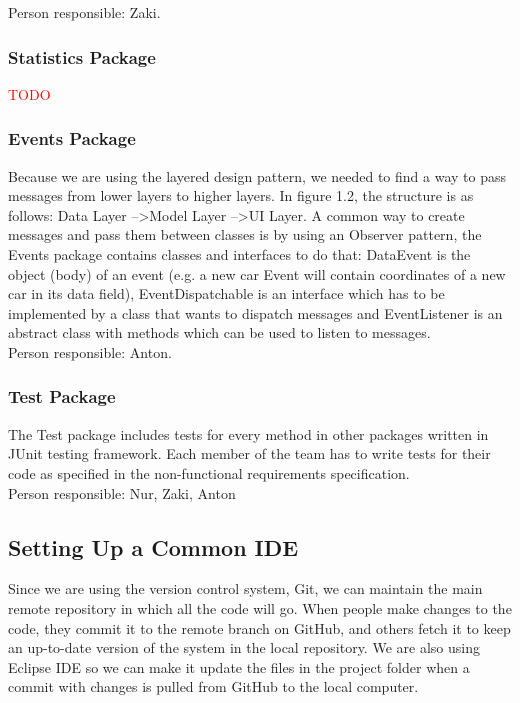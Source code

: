 \documentclass{article}
\begin{document}
	\noindent
	Person responsible: Zaki.
	
	\subsubsection{Statistics Package}
	\textcolor{red}{TODO}
	
	\subsubsection{Events Package}
	Because we are using the layered design pattern, we needed to find a way to pass messages from lower layers to higher layers. In figure 1.2, the structure is as follows: Data Layer --\textgreater Model Layer --\textgreater UI Layer. 
	A common way to create messages and pass them between classes is by using an Observer pattern, the Events package contains classes and interfaces to do that: DataEvent is the object (body) of an event (e.g. a new car Event will contain coordinates of a new car in its data field), EventDispatchable is an interface which has to be implemented by a class that wants to dispatch messages and EventListener is an abstract class with methods which can be used to listen to messages.\\
	
	\noindent
	Person responsible: Anton.
	
	\subsubsection{Test Package}
	The Test package includes tests for every method in other packages written in JUnit testing framework. 
	Each member of the team has to write  tests for their code as specified in the non-functional requirements specification.\\
	
	\noindent
	Person responsible: Nur, Zaki, Anton
	
	\subsection{Setting Up a Common IDE}
	
	Since we are using the version control system, Git, we can maintain the main remote repository in which all the code will go. 
	When people make changes to the code, they commit it to the remote branch on GitHub, and others fetch it to keep an up-to-date version of the system in the local repository. 
	We are also using Eclipse IDE so we can make it update the files in the project folder when a commit with changes is pulled from GitHub to the local computer.\\
	
\end{document}
